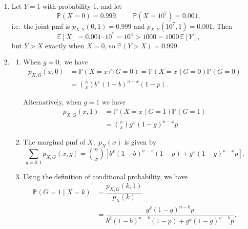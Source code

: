 \documentclass[12pt]{article}
\begin{document}
\begin{enumerate}
    Hence, we get
    \begin{align*}
      \mathbb E[X] &= \sum_{k = 0}^{\infty} \sum_{j = 1}^{c} (-1)^{j
      + 1} {c \choose j} \left(1 - \frac{j}{c}\right)^k \\
      &= \sum_{j = 1}^{c} (-1)^{j + 1} {c \choose j} \sum_{k =
      0}^{\infty}  \left(1-\frac{j}c{}\right)^{k} \\
      &= \sum_{j = 1}^{c} (-1)^{j + 1} {c \choose j} \dfrac{c}{j}\\
      &= \sum_{j = 1}^{c} (-1)^{j + 1} {c \choose j} \dfrac{c}{j}.
    \end{align*}

  \item Let $Y = 1$ with probability $1$, and let
    $$
    \mathbb P(X = 0) = 0.999, \qquad \mathbb P(X = 10^7) = 0.001,
    $$
    i.e.\ the joint pmf is $p_{X,Y}(0,1) = 0.999$ and $p_{X,Y}(10^7,
    1) = 0.001$. Then
    $$
    \mathbb E[X] = 0.001 \cdot 10^7 = 10^4 > 1000 = 1000\,\mathbb E[Y],
    $$
    but $Y > X$ exactly when $X = 0$, so $\mathbb P(Y > X) = 0.999$.

  \item
    \begin{enumerate}
      \item When $g = 0,$ we have
        \begin{align*}
          p_{X, G}(x, 0) &= \mathbb P(X = x \cap G  = 0) = \mathbb
          P(X = x \mid G = 0) \mathbb P(G =0) \\
          &= {n \choose x}b^{x}(1-b)^{n - x}(1-p).
        \end{align*}

        Alternatively, when $g =1 $ we have
        \begin{align*}
          p_{X, G}(x, 1) &= \mathbb P(X = x \mid G = 1) \mathbb P(G = 1) \\
          &=  {n \choose x} g^{x} (1-g)^{n -x }p
        \end{align*}

      \item The marginal pmf of $X,$ $p_X(x)$ is given by
        $$
        \sum_{g = 0, 1} p_{X, G}(x, g) = {n \choose x} \left[
          b^x(1-b)^{n-x}(1-p) + g^x (1-g)^{n-x}p
        \right].
        $$

      \item Using the definition of conditional probability, we have
        \begin{align*}
          \mathbb P(G = 1 \mid X = k) &= \dfrac{p_{X, G}(k, 1)}{p_{X}(k)} \\
          &= \dfrac{g^{k} (1-g)^{n -k }p}{
            b^k(1-b)^{n-k}(1-p) + g^k (1-g)^{n-k}p
          }.
        \end{align*}


\end{enumerate}
\end{enumerate}
\end{document}

